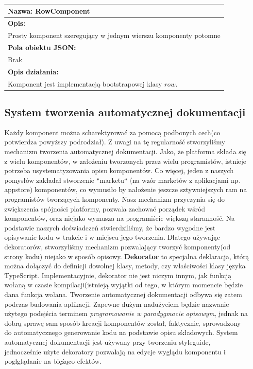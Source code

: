 \documentclass[licencjacka]{pracamgr}
\begin{document}

\begin{tabularx}{\linewidth}{|l|}\hline
\textbf{Nazwa:}
RowComponent
\\\hline
\textbf{Opis:}\\

Prosty komponent szeregujący w jednym wierszu komponenty potomne\\
\hline
\textbf{Pola obiektu JSON:} \\
Brak\\
\hline
\textbf{Opis działania:}\\
Komponent jest implementacją bootstrapowej klasy $row$.
\\\hline
\end{tabularx}

\subsection{System tworzenia automatycznej dokumentacji}
Każdy komponent można scharektyrować za pomocą podbonych cech(co potwierdza powyższy podrodział).
Z uwagi na tę regularność stworzyliśmy mechanizm tworzenia automatycznej dokumentacji.
Jako, że platforma składa się z wielu komponentów, w założeniu tworzonych przez wielu
programistów, istnieje potrzeba usystematyzowania opisu komponentów. Co więcej, jeden z naszych pomysłów
zakładał stworzenie ``marketu`` (na wzór marketów z aplikacjami np. appstore) komponentów, co wymusiło
by nałożenie jeszcze sztywniejszych ram na programistów tworzących komponenty.
Nasz mechanizm przyczynia się do zwiększenia spójności platformy, pozwala zachować porządek
wśród komponentów, oraz niejako wymusza na programiście większą staranność.
Na podstawie naszych doświadczeń stwierdziliśmy, że bardzo wygodne jest opisywanie
kodu w trakcie i w miejscu jego tworzenia. Dlatego używając dekoratorów,
stworzyliśmy mechanizm pozwalający tworzyć komponenty(od strony kodu) niejako w sposób opisowy.
\textbf{Dekorator} to specjalna deklaracja, którą można dołączyć do definicji dowolnej klasy, metody, czy właściwości klasy języka TypeScript. 
Implementacyjnie, dekorator nie jest niczym innym, jak funkcją wołaną w czasie kompilacji(istnieją wyjątki od tego, w którym momencie będzie dana funkcja wołana.
Tworzenie automatycznej dokumentacji odbywa się zatem podczas budowania aplikacji.
Zapewne dużym nadużyciem będzie nazwanie użytego podejścia terminem
\textit{programowanie w paradygmacie opisowym},
jednak na dobrą sprawę sam sposób kreacji komponentów został, faktycznie, sprowadzony do
automatycznego generowanie kodu na podstawie opisu składowych.
System automatycznej dokumentacji jest używany przy tworzeniu styleguide, jednocześnie użyte dekoratory pozwalają
na edycje wyglądu komponentu i poglglądanie na biężąco efektów. 
\end{document}
